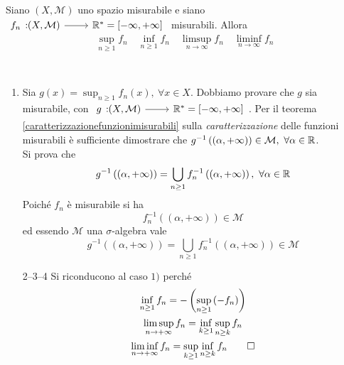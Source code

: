 \begin{proposition}
	Siano $ \left(X,\mathcal{M}\right)$ uno spazio misurabile e siano $\funz{f_n}{\left(X,\mathcal{M}\right)}{\realset^{\ast}=\left[-\infty,+\infty\right]}$ misurabili.
	Allora
	\begin{equation*}
		\sup_{n\geq 1} f_n\quad\inf_{n\geq 1} f_n\quad\limsup_{n\to\infty} f_n\quad\liminf_{n\to\infty} f_n
	\end{equation*}
\end{proposition}
\begin{demonstration}~{}
	\begin{enumerate}
		\item Sia $g\left(x\right)=\sup_{n\geq 1} f_n\left(x\right),\ \forall x\in X$. Dobbiamo provare che $g$ sia misurabile, con $\funz{g}{\left(X,\mathcal{M}\right)}{\realset^{\ast}=\left[-\infty,+\infty\right]}$. Per il teorema \ref{caratterizzazionefunzionimisurabili} sulla \textit{caratterizzazione} delle funzioni misurabili è sufficiente dimostrare che $g^{-1}\left(\left(\alpha,+\infty\right)\right)\in\mathcal{M},\ \forall\alpha\in\realset$.\\
		Si prova che
		\begin{equation*}
			g^{-1}\left(\left(\alpha,+\infty\right)\right)=\bigcup_{n\geq 1}f_n^{-1}\left(\left(\alpha,+\infty\right)\right),\ \forall \alpha\in\mathbb{R}
		\end{equation*}
	Poiché $f_n$ è misurabile si ha
	\begin{equation*}
		f_n^{-1}\left(\left(\alpha,+\infty\right)\right)\in\mathcal{M}
	\end{equation*}
ed essendo $\mathcal{M}$ una $\sigma$-algebra vale
	\begin{equation*}
	g^{-1}\left(\left(\alpha,+\infty\right)\right)=\bigcup_{n\geq 1}f_n^{-1}\left(\left(\alpha,+\infty\right)\right)\in\mathcal{M}
	\end{equation*}
	\item[2--3--4] Si riconducono al caso $1)$ perché
	\begin{gather*}
		\inf_{n\geq 1}f_n=-\left(\sup_{n\geq 1}\left(-f_n\right)\right)\\
		\limsup_{n\to+\infty}f_n=\inf_{k\geq 1}\sup_{n\geq k}f_n\\
		\liminf_{n\to+\infty}f_n=\sup_{k\geq 1}\inf_{n\geq k}f_n\qedhere
	\end{gather*}
	\end{enumerate}
\end{demonstration}

